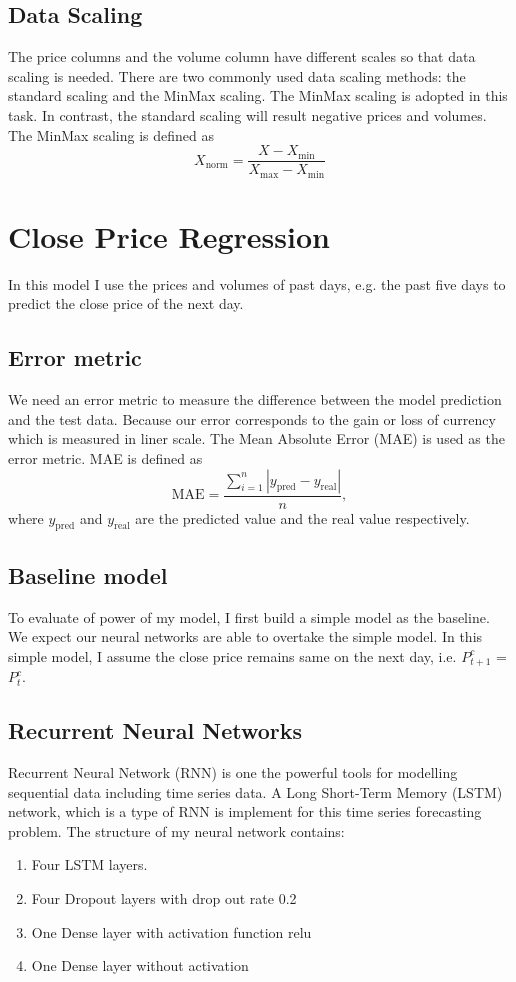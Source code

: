\documentclass[a4paper, 11pt, usenatbib]{article}
\begin{document}
\subsection{Data Scaling}
The price columns and the volume column have different scales so that data scaling is needed. There are two commonly used data scaling methods: the standard scaling and the MinMax scaling. The MinMax scaling is adopted in this task. In contrast, the standard scaling will result negative prices and volumes. The MinMax scaling is defined as
\begin{equation}
X_\mathrm{norm} = \frac{X-X_\mathrm{min}}{X_\mathrm{max} - X_\mathrm{min}}
\end{equation}


\section{Close Price Regression}
In this model I use the prices and volumes of past days, e.g. the past five days to predict the close price of the next day.

\subsection{Error metric}
We need an error metric to measure the difference between the model prediction and the test data. Because our error corresponds to the gain or loss of currency which is measured in liner scale. The Mean Absolute Error (MAE) is used as the error metric. MAE is defined as
\begin{equation}
\mathrm{MAE} = \frac{\sum_{i=1}^n |y_\mathrm{pred} - y_\mathrm{real}|}{n},
\end{equation}
where $y_\mathrm{pred}$ and $y_\mathrm{real}$ are the predicted value and the real value respectively.

\subsection{Baseline model}
To evaluate of power of my model, I first build a simple model as the baseline. We expect our neural networks are able to overtake the simple model. In this simple model, I assume the close price remains same on the next day, i.e. $P_{t+1}^c$ = $P_{t}^c$.

\subsection{Recurrent Neural Networks}
Recurrent Neural Network (RNN) is one the powerful tools for modelling sequential data including time series data. A Long Short-Term Memory (LSTM) network, which is a type of RNN is implement for this time series forecasting problem. The structure of my neural network contains:
\begin{enumerate}
\item Four LSTM layers.
\item Four Dropout layers with drop out rate 0.2
\item One Dense layer with activation function relu
\item One Dense layer without activation
\end{enumerate}
\end{document}
